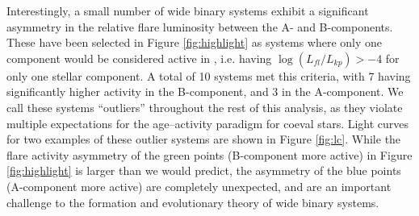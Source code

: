\documentclass[preprint2]{aastex61}
\begin{document}
Interestingly, a small number of wide binary systems exhibit a significant asymmetry in the relative flare luminosity between the A- and B-components. These have been selected in Figure \ref{fig:highlight} as systems where only one component would be considered active in \citet{davenport2016}, i.e. having $\log(L_{fl}/L_{kp}) > -4$ for only one stellar component. A total of 10 systems met this criteria, with 7 having significantly higher activity in the B-component, and 3 in the A-component. We call these systems ``outliers'' throughout the rest of this analysis, as they violate multiple expectations for the age--activity paradigm for coeval stars. Light curves for two examples of these outlier systems are shown in Figure \ref{fig:lc}. While the flare activity asymmetry of the green points (B-component more active) in Figure \ref{fig:highlight} is larger than we would predict, the asymmetry of the blue points (A-component more active) are completely unexpected, and are an important challenge to the formation and evolutionary theory of wide binary systems. 
\end{document}
